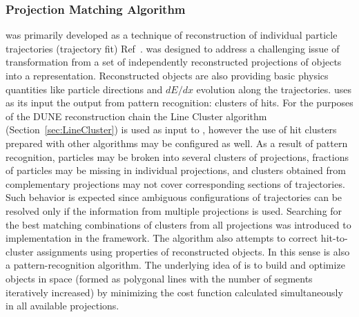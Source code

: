 \subsubsection{Projection Matching Algorithm}\label{sec:PMA}
  was primarily developed as a technique of \threed reconstruction of individual particle trajectories (trajectory fit) Ref~\cite{Antonello:2012hu}.  was designed to address a challenging issue of transformation from a set of independently reconstructed \twod projections of objects into a \threed representation. Reconstructed \threed objects are also providing  basic physics quantities like particle directions and $dE/dx$ evolution along the trajectories.  uses as its input the output from \twod pattern recognition: clusters of hits. For the purposes of the DUNE reconstruction chain the Line Cluster algorithm (Section~\ref{sec:LineCluster}) is used as input to , however the use of hit clusters prepared with other algorithms may be configured as well. As a result of \twod pattern recognition, particles may be broken into several clusters of \twod projections, fractions of particles may be missing in individual projections, and clusters obtained from complementary projections %
may not cover corresponding sections of trajectories. Such behavior is expected since ambiguous configurations of trajectories can be resolved only if the information from multiple \twod projections is used. Searching for the best matching combinations of clusters from all \twod projections was introduced to  implementation in the  framework. The algorithm also attempts to correct hit-to-cluster assignments using properties of \threed reconstructed objects. In this sense  is also a pattern-recognition algorithm.
The underlying idea of  is to build and optimize objects in \threed space (formed as polygonal lines with %
the number of segments iteratively increased) by minimizing the cost function calculated simultaneously in all available \twod projections. %
